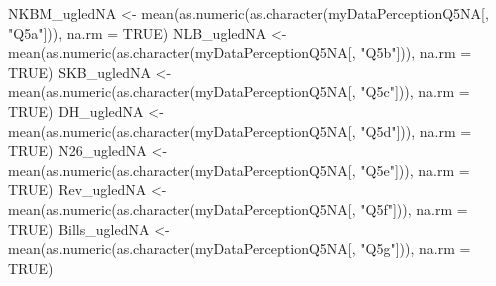 \documentclass[
]{article}
\newenvironment{Shaded}{\begin{snugshade}}{\end{snugshade}}
\newcommand{\AttributeTok}[1]{\textcolor[rgb]{0.77,0.63,0.00}{#1}}
\newcommand{\ConstantTok}[1]{\textcolor[rgb]{0.00,0.00,0.00}{#1}}
\newcommand{\FunctionTok}[1]{\textcolor[rgb]{0.00,0.00,0.00}{#1}}
\newcommand{\NormalTok}[1]{#1}
\newcommand{\OtherTok}[1]{\textcolor[rgb]{0.56,0.35,0.01}{#1}}
\newcommand{\StringTok}[1]{\textcolor[rgb]{0.31,0.60,0.02}{#1}}
\begin{document}
\begin{Shaded}
\begin{Highlighting}[]
\NormalTok{NKBM\_ugledNA }\OtherTok{\textless{}{-}} \FunctionTok{mean}\NormalTok{(}\FunctionTok{as.numeric}\NormalTok{(}\FunctionTok{as.character}\NormalTok{(myDataPerceptionQ5NA[, }\StringTok{"Q5a"}\NormalTok{])), }\AttributeTok{na.rm =} \ConstantTok{TRUE}\NormalTok{)}
\NormalTok{NLB\_ugledNA }\OtherTok{\textless{}{-}} \FunctionTok{mean}\NormalTok{(}\FunctionTok{as.numeric}\NormalTok{(}\FunctionTok{as.character}\NormalTok{(myDataPerceptionQ5NA[, }\StringTok{"Q5b"}\NormalTok{])), }\AttributeTok{na.rm =} \ConstantTok{TRUE}\NormalTok{)}
\NormalTok{SKB\_ugledNA }\OtherTok{\textless{}{-}} \FunctionTok{mean}\NormalTok{(}\FunctionTok{as.numeric}\NormalTok{(}\FunctionTok{as.character}\NormalTok{(myDataPerceptionQ5NA[, }\StringTok{"Q5c"}\NormalTok{])), }\AttributeTok{na.rm =} \ConstantTok{TRUE}\NormalTok{)}
\NormalTok{DH\_ugledNA }\OtherTok{\textless{}{-}} \FunctionTok{mean}\NormalTok{(}\FunctionTok{as.numeric}\NormalTok{(}\FunctionTok{as.character}\NormalTok{(myDataPerceptionQ5NA[, }\StringTok{"Q5d"}\NormalTok{])), }\AttributeTok{na.rm =} \ConstantTok{TRUE}\NormalTok{)}
\NormalTok{N26\_ugledNA }\OtherTok{\textless{}{-}} \FunctionTok{mean}\NormalTok{(}\FunctionTok{as.numeric}\NormalTok{(}\FunctionTok{as.character}\NormalTok{(myDataPerceptionQ5NA[, }\StringTok{"Q5e"}\NormalTok{])), }\AttributeTok{na.rm =} \ConstantTok{TRUE}\NormalTok{)}
\NormalTok{Rev\_ugledNA }\OtherTok{\textless{}{-}} \FunctionTok{mean}\NormalTok{(}\FunctionTok{as.numeric}\NormalTok{(}\FunctionTok{as.character}\NormalTok{(myDataPerceptionQ5NA[, }\StringTok{"Q5f"}\NormalTok{])), }\AttributeTok{na.rm =} \ConstantTok{TRUE}\NormalTok{)}
\NormalTok{Bills\_ugledNA }\OtherTok{\textless{}{-}} \FunctionTok{mean}\NormalTok{(}\FunctionTok{as.numeric}\NormalTok{(}\FunctionTok{as.character}\NormalTok{(myDataPerceptionQ5NA[, }\StringTok{"Q5g"}\NormalTok{])), }\AttributeTok{na.rm =} \ConstantTok{TRUE}\NormalTok{)}


\end{Highlighting}
\end{Shaded}
\end{document}

